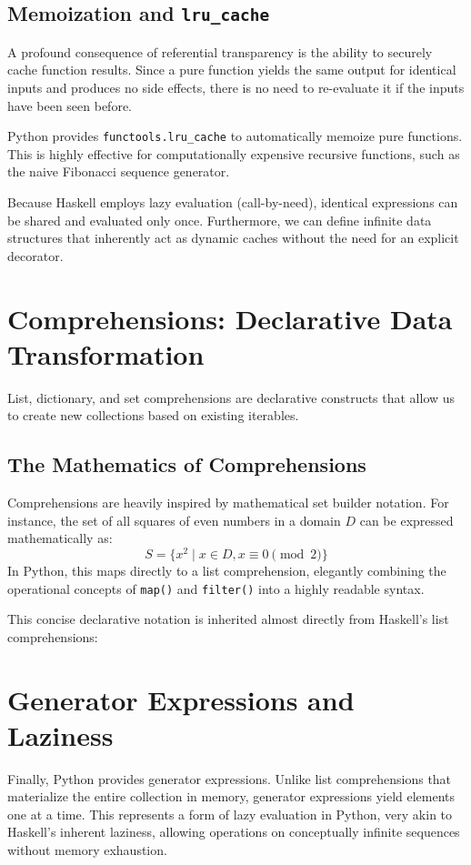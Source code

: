 \subsection{Memoization and \texttt{lru\_cache}}

A profound consequence of referential transparency is the ability to securely cache function results. Since a pure function yields the same output for identical inputs and produces no side effects, there is no need to re-evaluate it if the inputs have been seen before.

Python provides \texttt{functools.lru\_cache} to automatically memoize pure functions. This is highly effective for computationally expensive recursive functions, such as the naive Fibonacci sequence generator. 

Because Haskell employs lazy evaluation (call-by-need), identical expressions can be shared and evaluated only once. Furthermore, we can define infinite data structures that inherently act as dynamic caches without the need for an explicit decorator.

\section{Comprehensions: Declarative Data Transformation}

List, dictionary, and set comprehensions are declarative constructs that allow us to create new collections based on existing iterables. 

\subsection{The Mathematics of Comprehensions}

Comprehensions are heavily inspired by mathematical set builder notation. For instance, the set of all squares of even numbers in a domain $D$ can be expressed mathematically as:
\[
S = \{ x^2 \mid x \in D, x \equiv 0 \pmod{2} \}
\]
In Python, this maps directly to a list comprehension, elegantly combining the operational concepts of \texttt{map()} and \texttt{filter()} into a highly readable syntax.



This concise declarative notation is inherited almost directly from Haskell's list comprehensions:



\section{Generator Expressions and Laziness}

Finally, Python provides generator expressions. Unlike list comprehensions that materialize the entire collection in memory, generator expressions yield elements one at a time. This represents a form of lazy evaluation in Python, very akin to Haskell's inherent laziness, allowing operations on conceptually infinite sequences without memory exhaustion.
